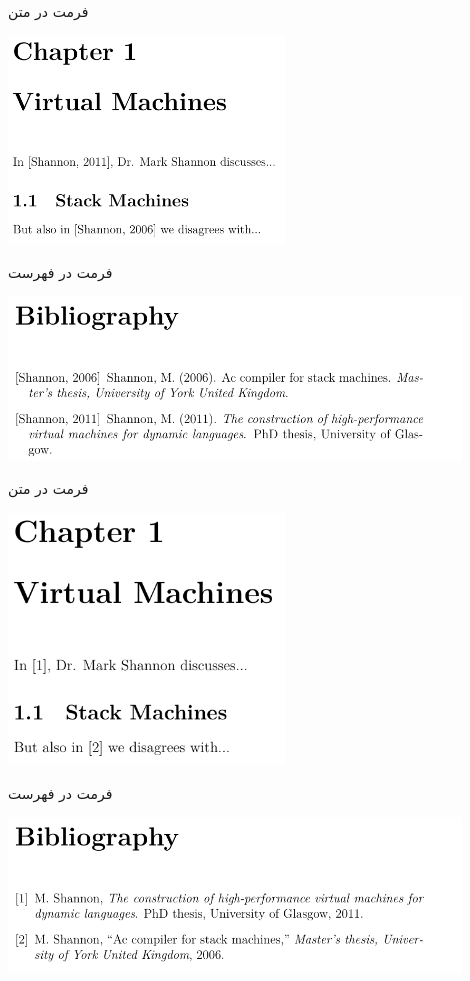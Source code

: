 \begin{frame}{فرمت  در متن}
\begin{center}
\includegraphics[width=0.55\textwidth, height=0.7\textheight]{docs/images/apalike-1}
\end{center}
\end{frame}

\begin{frame}{فرمت  در فهرست}
\begin{center}
\includegraphics[width=0.9\textwidth, height=0.5\textheight]{docs/images/apalike-2}
\end{center}
\end{frame}

\begin{frame}{فرمت  در متن}
\begin{center}
\includegraphics[width=0.55\textwidth, height=0.7\textheight]{docs/images/ieeetr-1}
\end{center}
\end{frame}

\begin{frame}{فرمت  در فهرست}
\begin{center}
\includegraphics[width=0.9\textwidth, height=0.5\textheight]{docs/images/ieeetr-2}
\end{center}
\end{frame}
